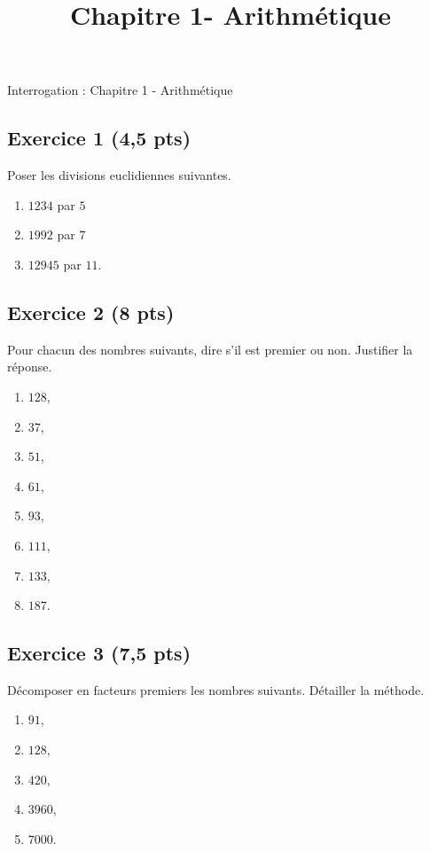 \documentclass[14 pt]{extarticle}
\title{Chapitre 1-  Arithmétique}
\date{}
\theoremstyle{plain}
\begin{document}
\begin{center}{\Large Interrogation : Chapitre 1 - Arithmétique}\\ 
 \end{center}




\subsection*{Exercice 1 (4,5 pts)}
 Poser les divisions euclidiennes suivantes. 
 
 
 \begin{enumerate}
 \item $1234$ par $5$
 \item $1992$ par $7$ 
 \item $12 945$ par $11$. 
 \end{enumerate}
 \subsection*{Exercice 2 (8 pts)}
 
 Pour chacun des nombres suivants, dire s'il est premier ou non. Justifier la réponse. 
\begin{enumerate}
\item $128$,
\item $37$,
\item $51$,
\item $61$,
\item $93$,
\item $111$, 
\item $133$, 
\item $187$.
\end{enumerate}

\subsection*{Exercice 3 (7,5 pts)}
Décomposer en facteurs premiers les nombres suivants. Détailler la méthode. 

\begin{enumerate}
\item $91$,
\item $128$,
\item $420$,
\item $3960$,
\item $7000$.
\end{enumerate}



\newpage
\end{document}
